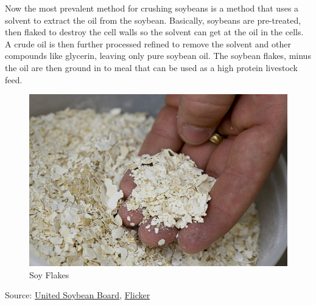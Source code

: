 \documentclass[
  letterpaper,
  DIV=11,
  numbers=noendperiod]{scrreprt}
\begin{document}
Now the most prevalent method for crushing soybeans is a method that
uses a solvent to extract the oil from the soybean. Basically, soybeans
are pre-treated, then flaked to destroy the cell walls so the solvent
can get at the oil in the cells. A crude oil is then further processed
refined to remove the solvent and other compounds like glycerin, leaving
only pure soybean oil. The soybean flakes, minus the oil are then ground
in to meal that can be used as a high protein livestock feed.

\begin{figure}

{\centering \includegraphics{images/soyflakes.jpg}

}

\caption{Soy Flakes}

\end{figure}

Source: \href{http://unitedsoybean.org/}{United Soybean Board},
\href{https://www.flickr.com/photos/unitedsoybean/10059015936/}{Flicker}
\end{document}
